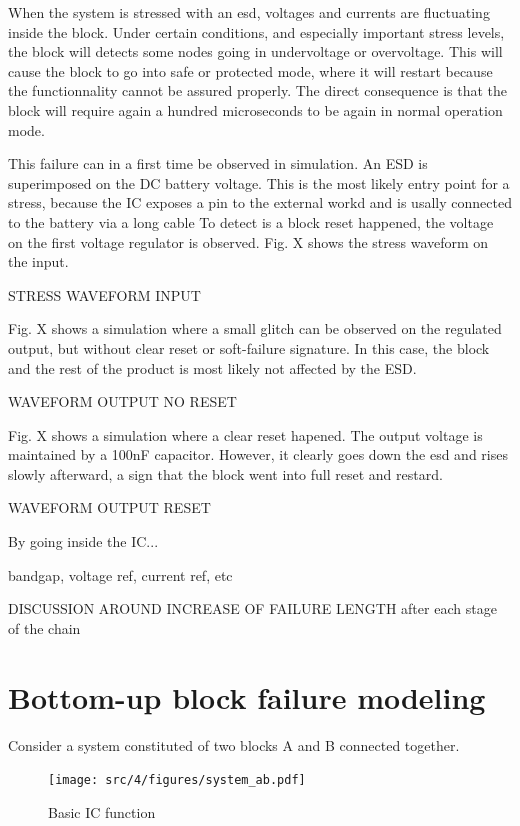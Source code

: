 When the system is stressed with an \gls{esd}, voltages and currents are fluctuating inside the block.
Under certain conditions, and especially important stress levels, the block will detects some nodes going in undervoltage or overvoltage.
This will cause the block to go into safe or protected mode, where it will restart because the functionnality cannot be assured properly.
The direct consequence is that the block will require again a hundred microseconds to be again in normal operation mode.

This failure can in a first time be observed in simulation.
An \gls{ESD} is superimposed on the DC battery voltage.
This is the most likely entry point for a stress, because the \gls{IC} exposes a pin to the external workd and is usally connected to the battery via a long cable
To detect is a block reset happened, the voltage on the first voltage regulator is observed.
Fig. X shows the stress waveform on the input.

STRESS WAVEFORM INPUT

Fig. X shows a simulation where a small glitch can be observed on the regulated output, but without clear reset or soft-failure signature.
In this case, the block and the rest of the product is most likely not affected by the ESD.

WAVEFORM OUTPUT NO RESET

Fig. X shows a simulation where a clear reset hapened.
The output voltage is maintained by a 100nF capacitor.
However, it clearly goes down  the \gls{esd} and rises slowly afterward, a sign that the block went into full reset and restard.

WAVEFORM OUTPUT RESET

By going inside the \gls{IC}...

bandgap, voltage ref, current ref, etc

DISCUSSION AROUND INCREASE OF FAILURE LENGTH after each stage of the chain

\section{Bottom-up block failure modeling}

Consider a system constituted of two blocks A and B connected together.

\begin{figure}[!htbp]
  \centering
  \texttt{[image: src/4/figures/system\_ab.pdf]}
  \caption{Basic IC function}
  \label{basic_ic_function}
\end{figure}

